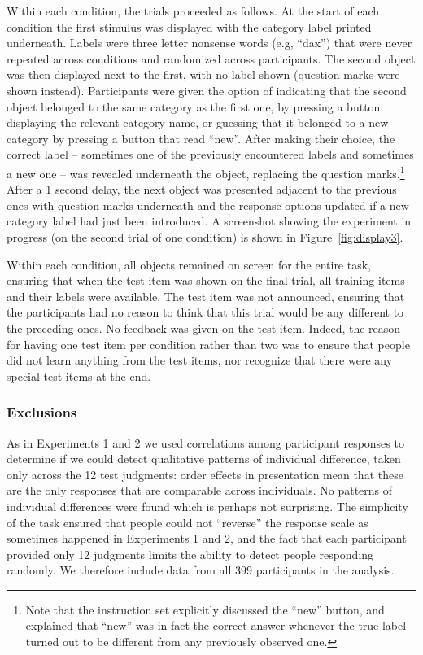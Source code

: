 \documentclass[doc]{apa6}
\begin{document}
Within each condition, the trials proceeded as follows. At the start of each condition the first stimulus was displayed with the category label printed underneath. Labels were three letter nonsense words (e.g, ``dax'') that were never repeated across conditions and randomized across participants. The second object was then displayed next to the first, with no label shown (question marks were shown instead). Participants were given the option of indicating that the second object belonged to the same category as the first one, by pressing a button displaying the relevant category name, or guessing that it belonged to a new category by pressing a button that read ``new''. After making their choice, the correct label  -- sometimes one of the previously encountered labels and sometimes a new one -- was revealed underneath the object, replacing the question marks.\footnote{Note that the instruction set explicitly discussed the ``new'' button, and explained that ``new'' was in fact the correct answer whenever the true label turned out to be different from any previously observed one.} After a 1 second delay, the next object was presented adjacent to the previous ones with question marks underneath and the response options updated if a new category label had just been introduced. A screenshot showing the experiment in progress (on the second trial of one condition) is shown in Figure~\ref{fig:display3}.

Within each condition, all objects remained on screen for the entire task, ensuring that when the test item was shown on the final trial, all training items and their labels were available. The test item was not announced, ensuring that the participants had no reason to think that this trial would be any different to the preceding ones. No feedback was given on the test item. Indeed, the reason for having one test item per condition rather than two was to ensure that people did not learn anything from the test items, nor recognize that there were any special test items at the end.


\subsubsection{Exclusions} As in Experiments 1 and 2 we used correlations among participant responses to determine if we could detect qualitative patterns of individual difference, taken only across the 12 test judgments: order effects in presentation mean that these are the only responses that are comparable across individuals.  No patterns of individual differences were found which is perhaps not surprising. The simplicity of the task ensured that people could not ``reverse'' the response scale as sometimes happened in Experiments 1 and 2, and the fact that each participant provided only 12 judgments limits the ability to detect people responding randomly. We therefore include data from all 399 participants in the analysis.
\end{document}
